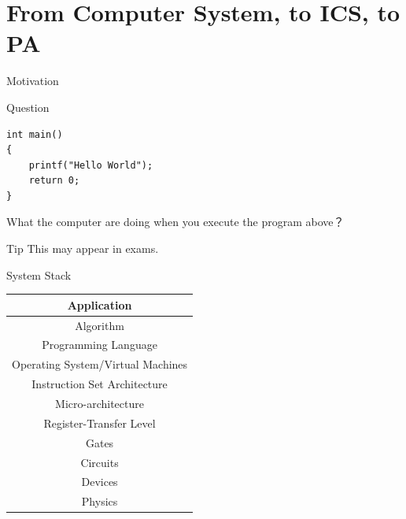 \documentclass[handout]{beamer}
\begin{document}
\section{From Computer System, to ICS, to PA}

\begin{frame}
\end{frame}

\begin{frame}[fragile]{Motivation}
\begin{exampleblock}{Question}
\begin{verbatim}
int main()
{
    printf("Hello World");
    return 0;
}
\end{verbatim}
What the computer are doing when you execute the program above？
\end{exampleblock}

\begin{alertblock}{Tip}
	This may appear in exams.
\end{alertblock}

\end{frame}




\begin{frame}{System Stack}
\begin{table}
	\centering
	\begin{tabular}{|c|}
		\hline
		Application \\	
		\hline
		Algorithm\\
		\hline
		Programming Language\\
		\hline
		Operating System/Virtual Machines\\
		\hline
		\alert{Instruction Set Architecture}		\\
		\hline
		Micro-architecture\\
		\hline
		Register-Transfer Level\\
		\hline
		Gates\\
		\hline
		Circuits\\
		\hline
		Devices\\
		\hline
		Physics\\
		\hline
	\end{tabular}
\end{table}
\end{frame}
\end{document}
